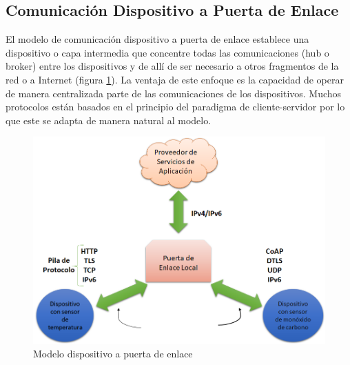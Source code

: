 \subsection{Comunicación Dispositivo a Puerta de Enlace}
El modelo de comunicación dispositivo a puerta de enlace establece una dispositivo o capa intermedia que concentre todas las comunicaciones (hub o broker) entre los dispositivos y de allí de ser necesario a otros fragmentos de la red o a Internet (figura \ref{fig:d2g}). La ventaja de este enfoque es la capacidad de operar de manera centralizada parte de las comunicaciones de los dispositivos. Muchos protocolos están basados en el principio del paradigma de cliente-servidor por lo que este se adapta de manera natural al modelo.
\begin{figure}[htb]
\centering
\includegraphics[scale=0.425]{./Figuras/d2g.png}
\caption{Modelo dispositivo a puerta de enlace}
\label{fig:d2g}
\vspace*{-10pt}
\end{figure}

